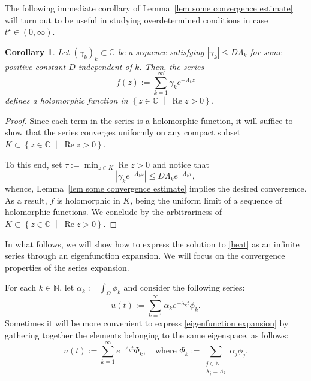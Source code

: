 \documentclass[a4paper,11pt]{article}
\newtheorem{corollary}[theorem]{Corollary}
\newcommand{\re}{\mathop{\mathrm{Re}}}
\newcommand\setbld[2]{\left\{ #1 \;\middle |\; #2\right\}}
\numberwithin{equation}{section}
\begin{document}
The following immediate corollary of Lemma~\ref{lem some convergence estimate} will turn out to be useful in studying overdetermined conditions in case $t^\star\in (0,\infty)$.
\begin{corollary}\label{cor holomorphic function}
Let $(\gamma_k)_k\subset\mathbb{C}$ be a sequence satisfying 
$|\gamma_k|\le D \Lambda_k$ for some positive constant $D$ independent of $k$. Then, the series 
\begin{equation*}
    f(z):=\sum_{k=1}^\infty \gamma_k e^{-\Lambda_k z}
\end{equation*}
defines a holomorphic function in $\setbld{z\in \mathbb{C}}{\re{z}>0}$. 
\end{corollary}
\begin{proof}
   Since each term in the series is a holomorphic function, it will suffice to show that the series converges uniformly on any compact subset $K\subset\setbld{z\in \mathbb{C}}{\re z>0}$.

   To this end, set $\tau := \min_{z\in K} \re z >0$ and notice that 
   \begin{equation*}
       \left|\gamma_k e^{-\Lambda_k z}\right|\le D \Lambda_k e^{-\Lambda_k \tau}, 
   \end{equation*}
whence, Lemma~\ref{lem some convergence estimate} implies the desired convergence. As a result, $f$ is holomorphic in $K$, being the uniform limit of a sequence of holomorphic functions. We conclude by the arbitrariness of $K\subset\setbld{z\in\mathbb{C}}{\re z>0}$.
\end{proof}

In what follows, we will show how to express the solution to \eqref{heat} as an infinite series through an eigenfunction expansion. We will focus on the convergence properties of the series expansion. 

For each $k\in \mathbb{N}$, let $\alpha_k:=\int_\Omega \phi_k$ and consider the following series:
\begin{equation}\label{eigenfunction expansion}
u(t):=\sum_{k=1}^\infty \alpha_k e^{-\lambda_k t}\phi_k. 
\end{equation}
Sometimes it will be more convenient to express \eqref{eigenfunction expansion} by gathering together the elements belonging to the same eigenspace, as follows:
\begin{equation}\label{eigenfunction expansion II}
 u(t):=\sum_{k=1}^\infty e^{-\Lambda_k t} \Phi_k,\quad \text{where }\Phi_k:=\sum_{\substack{j\in \mathbb{N}\\ \lambda_j=\Lambda_k}} \alpha_j\phi_j.
\end{equation}
\end{document}
